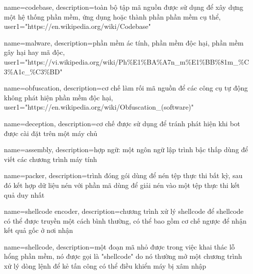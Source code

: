
{
	name={codebase},
	description={toàn bộ tập mã nguồn được sử dụng để xây dựng một hệ thống phần mềm, ứng dụng hoặc thành phần phần mềm cụ thể},
	user1={"https://en.wikipedia.org/wiki/Codebase"}
}

{
	name={malware},
	description={phần mềm ác tính, phần mềm độc hại, phần mềm gây hại hay mã độc},
	user1={"https://vi.wikipedia.org/wiki/Ph\%E1\%BA\%A7n_m\%E1\%BB\%81m_\%C3\%A1c_\%C3\%BD"}
}

{
	name={obfuscation},
	description={cơ chế làm rối mã nguồn để các công cụ tự động không phát hiện phần mềm độc hại},
	user1={"https://en.wikipedia.org/wiki/Obfuscation_(software)"}
}

{
	name={deception},
	description={cơ chế được sử dụng để tránh phát hiện khi bot được cài đặt trên một máy chủ}
}

{
	name={assembly},
	description={hợp ngữ: một ngôn ngữ lập trình bậc thấp dùng để viết các chương trình máy tính}
}

{
	name={packer},
	description={trình đóng gói dùng để nén tệp thực thi bất kỳ, sau đó kết hợp dữ liệu nén với phần mã dùng để giải nén vào một tệp thực thi kết quả duy nhất}
}

{
	name={shellcode encoder},
	description={chương trình xử lý shellcode để shellcode có thể được truyền một cách bình thường, có thể bao gồm cơ chế ngược để nhận kết quả gốc ở nơi nhận}
}

{
	name={shellcode},
	description={một đoạn mã nhỏ được trong việc khai thác lỗ hổng phần mềm, nó được gọi là "shellcode" do nó thường mở một chương trình xử lý dòng lệnh để kẻ tấn công có thể điều khiển máy bị xâm nhập}
}

